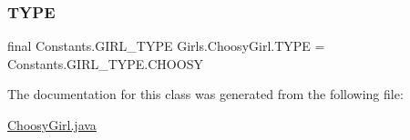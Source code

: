\subsubsection{\texorpdfstring{T\+Y\+PE}{TYPE}}
{\footnotesize\ttfamily final Constants.\+G\+I\+R\+L\+\_\+\+T\+Y\+PE Girls.\+Choosy\+Girl.\+T\+Y\+PE = Constants.\+G\+I\+R\+L\+\_\+\+T\+Y\+P\+E.\+C\+H\+O\+O\+SY}



The documentation for this class was generated from the following file\+:\begin{DoxyCompactItemize}
\item 
\hyperlink{_choosy_girl_8java}{Choosy\+Girl.\+java}\end{DoxyCompactItemize}

